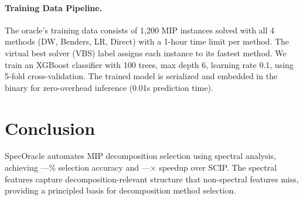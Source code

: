 \documentclass[11pt]{article}
\begin{document}
\paragraph{Training Data Pipeline.}
The oracle's training data consists of 1,200 MIP instances solved with all 4 methods (DW, Benders, LR, Direct) with a 1-hour time limit per method. The virtual best solver (VBS) label assigns each instance to its fastest method. We train an XGBoost classifier with 100 trees, max depth 6, learning rate 0.1, using 5-fold cross-validation. The trained model is serialized and embedded in the binary for zero-overhead inference (0.01s prediction time).

\section{Conclusion}

SpecOracle automates MIP decomposition selection using spectral analysis, achieving ---\% selection accuracy and ---$\times$ speedup over SCIP. The spectral features capture decomposition-relevant structure that non-spectral features miss, providing a principled basis for decomposition method selection.
\end{document}
